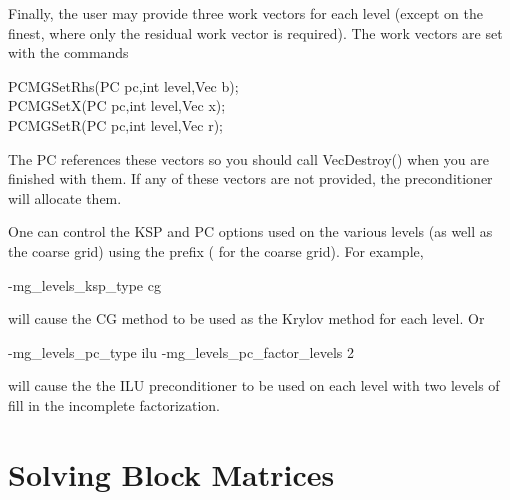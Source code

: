 Finally, the user may provide three work vectors for each level
(except on the finest, where only the residual work vector is required).
The work vectors are set with the
commands
\begin{tabbing}
  PCMGSetRhs(PC pc,int level,Vec b);\\
  PCMGSetX(PC pc,int level,Vec x);\\
  PCMGSetR(PC pc,int level,Vec r);
\end{tabbing}
The PC references these vectors so you should call VecDestroy()
when you are finished with them.  If any of these vectors are not
provided, the preconditioner will allocate them.

One can control the KSP and PC options used on the various levels
(as well as the coarse grid) using the prefix 
( for the coarse grid).
 For example,
\begin{tabbing}
  -mg\_levels\_ksp\_type cg
\end{tabbing}
will cause the CG method to be used as the Krylov method for each level.
Or
\begin{tabbing}
  -mg\_levels\_pc\_type ilu -mg\_levels\_pc\_factor\_levels 2
\end{tabbing}
will cause the the ILU preconditioner to be used on each level with
two levels of fill in the incomplete factorization.

\section{Solving Block Matrices}
\label{sec_block_matrices}

